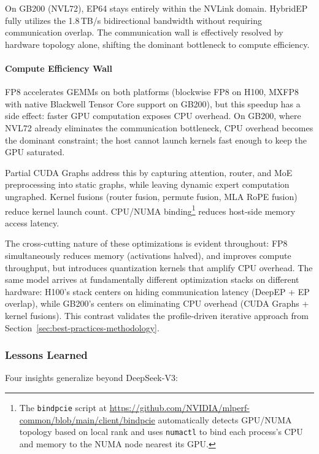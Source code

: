 \documentclass[10pt,logo,copyright]{nvidiatechreport}
\begin{document}
On GB200 (NVL72), EP64 stays entirely within the NVLink domain. HybridEP fully utilizes the 1.8\,TB/s bidirectional bandwidth without requiring communication overlap. The communication wall is effectively resolved by hardware topology alone, shifting the dominant bottleneck to compute efficiency.

\paragraph*{Compute Efficiency Wall}
FP8 accelerates GEMMs on both platforms (blockwise FP8 on H100, MXFP8 with native Blackwell Tensor Core support on GB200), but this speedup has a side effect: faster GPU computation exposes CPU overhead. On GB200, where NVL72 already eliminates the communication bottleneck, CPU overhead becomes the dominant constraint; the host cannot launch kernels fast enough to keep the GPU saturated.

Partial CUDA Graphs address this by capturing attention, router, and MoE preprocessing into static graphs, while leaving dynamic expert computation ungraphed. Kernel fusions (router fusion, permute fusion, MLA RoPE fusion) reduce kernel launch count. CPU/NUMA binding\footnote{The \texttt{bindpcie} script at \url{https://github.com/NVIDIA/mlperf-common/blob/main/client/bindpcie} automatically detects GPU/NUMA topology based on local rank and uses \texttt{numactl} to bind each process's CPU and memory to the NUMA node nearest its GPU.} reduces host-side memory access latency.

\medskip

The cross-cutting nature of these optimizations is evident throughout: FP8 simultaneously reduces memory (activations halved), and improves compute throughput, but introduces quantization kernels that amplify CPU overhead. The same model arrives at fundamentally different optimization stacks on different hardware: H100's stack centers on hiding communication latency (DeepEP + EP overlap), while GB200's centers on eliminating CPU overhead (CUDA Graphs + kernel fusions). This contrast validates the profile-driven iterative approach from Section~\ref{sec:best-practices-methodology}.

\subsubsection{Lessons Learned}

Four insights generalize beyond DeepSeek-V3:
\end{document}
